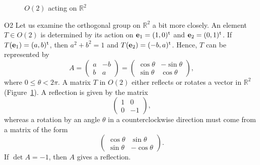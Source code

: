  
 
\begin{figure}[htb]

\begin{center}
\end{center}

\caption{$O(2)$ acting on ${\mathbb R}^2$}
\label{O2}
\end{figure}
 
\begin{example}{O2}
Let us examine the orthogonal group  on ${\mathbb R}^2$ a bit more
closely.  An element $T \in O(2)$ is determined by its action on
${\mathbf e}_1 = (1, 0)^{\rm t}$ and ${\mathbf e}_2 = (0, 1)^{\rm t}$. If
$T({\mathbf e}_1) = (a,b)^{\rm t}$, then $a^2 + b^2 = 1$ and $T({\mathbf
e}_2) = (-b, a)^{\rm t}$. Hence, $T$ can be represented by 
\[
A
=
\begin{pmatrix}
a & -b \\
b & a
\end{pmatrix}
=
\begin{pmatrix}
\cos \theta & - \sin \theta \\
\sin \theta & \cos \theta
\end{pmatrix},
\]
where $0 \leq \theta < 2 \pi$. A matrix $T$ in $O(2)$ either reflects
or rotates a vector in ${\mathbb R}^2$ (Figure~\ref{O2}). A reflection is
given by the matrix 
\[
\begin{pmatrix}
1 & 0 \\
0 & -1
\end{pmatrix},
\]
whereas a rotation by an angle $\theta$ in a counterclockwise direction
must come from a matrix of the form 
\[
\begin{pmatrix}
\cos \theta & \sin \theta \\
\sin \theta & -\cos \theta
\end{pmatrix}.
\]
If $\det A =-1$, then $A$ gives a reflection.
\end{example}
 
